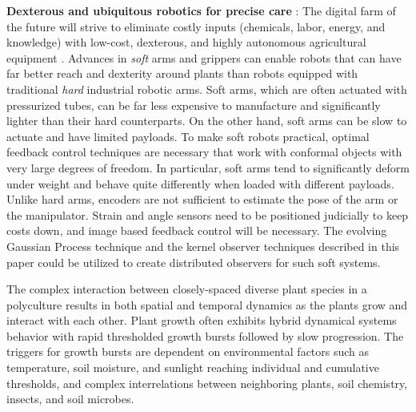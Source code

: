 \textbf{Dexterous and ubiquitous robotics for precise care} : The digital farm of the future will strive to eliminate costly inputs (chemicals, labor, energy, and knowledge) with low-cost, dexterous, and highly autonomous agricultural equipment \cite{pedersen2006agricultural}. Advances in \textit{soft} arms and grippers can enable robots that can have far better reach and dexterity around plants than robots equipped with traditional \textit{hard} industrial robotic arms. Soft arms, which are often actuated with pressurized tubes, can be far less expensive to manufacture and significantly lighter than their hard counterparts. On the other hand, soft arms can be slow to actuate and have limited payloads. To make soft robots practical, optimal feedback control techniques are necessary that work with conformal objects with very large degrees of freedom. In particular, soft arms tend to significantly deform under weight and behave quite differently when loaded with different payloads. Unlike hard arms, encoders are not sufficient to estimate the pose of the arm or the manipulator. Strain and angle sensors need to be positioned judicially to keep costs down, and image based feedback control will be necessary. The evolving Gaussian Process technique and the kernel observer techniques described in this paper could be utilized to create distributed observers for such soft systems.  

The complex interaction between closely-spaced diverse plant species in a polyculture results in both spatial and temporal dynamics as the plants grow and interact with each other. %
Plant growth often exhibits hybrid dynamical systems behavior with rapid thresholded growth bursts followed by slow progression. The triggers for growth bursts are dependent on  environmental factors such as temperature, soil moisture, and sunlight reaching individual and cumulative thresholds, and complex interrelations between neighboring plants, soil chemistry, insects, and soil microbes. 

